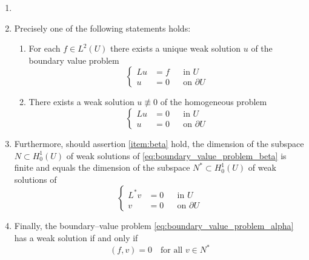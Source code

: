\begin{theorem} \label{teo:weak_solution}	
	\begin{enumerate}[label={(\arabic*)}, topsep=0pt]
		\item[]
		\item Precisely one of the following statements holds:
		\begin{enumerate}[label={(1.\arabic*)}, topsep=0pt]
			\item For each $f \in L^2(U)$ there exists a unique weak solution $u$ of
			the boundary value problem \label{item:alpha}
			\begin{equation} \label{eq:boundary_value_problem_alpha}
				\left\{
					\begin{aligned}
						L u &= f & &\text{in } U \\
						u &= 0 & &\text{on } \partial U
					\end{aligned}
				\right.
			\end{equation}
			\item There exists a weak solution $u \not\equiv 0$ of the homogeneous
			problem \label{item:beta}
			\begin{equation} \label{eq:boundary_value_problem_beta}
				\left\{
					\begin{aligned}
						L u &= 0 & &\text{in } U \\
						u &= 0 & &\text{on } \partial U
					\end{aligned}
				\right.
			\end{equation}
		\end{enumerate}
		\item Furthermore, should assertion \ref{item:beta} hold, the dimension
		of the subspace $N \subset H_0^1(U)$ of weak solutions of
		\eqref{eq:boundary_value_problem_beta} is finite and equals the
		dimension of the subspace $N^\ast \subset H_0^1(U)$ of weak solutions of
		\begin{equation}			
			\left\{
				\begin{aligned}
					L^\ast v &= 0 & &\text{in } U \\
					v &= 0 & &\text{on } \partial U
				\end{aligned}
			\right.
		\end{equation}
		\item Finally, the boundary--value problem
		\eqref{eq:boundary_value_problem_alpha} has a weak solution if and only if 
		\begin{equation}
			(f, v) = 0 \quad \text{for all } v \in N^\ast
		\end{equation}
	\end{enumerate}
\end{theorem}



